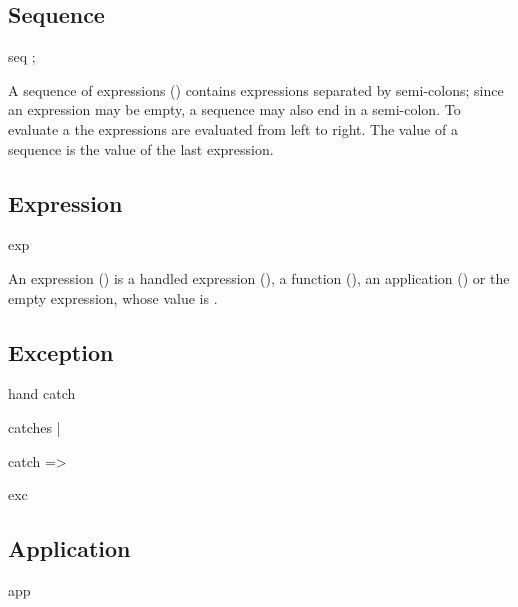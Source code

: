 \documentclass[english]{article}
\newcommand{\cont}{\noindent}
\begin{document}
\subsection{Sequence}

\begin{bnfc}
\item[seq] ; \pclosure
\end{bnfc}

\cont A sequence of expressions () contains expressions
separated by semi-colons; since an expression may be empty, a sequence
may also end in a semi-colon. To evaluate a  the expressions
are evaluated from left to right. The value of a sequence is the value
of the last expression.


\subsection{Expression}

\begin{bnfc}
\item[exp]\Alt{}\Alt{}
\end{bnfc}

\cont An expression () is a handled expression
(), a function (), an application ()
or the empty expression, whose value is .


\subsection{Exception}

\begin{bnfc}
\item[hand] catch 
\item[catches]\Alt{} | 
\item[catch] => 
\item[exc]
\end{bnfc}

\cont


\subsection{Application}

\begin{bnfc}
\item[app]\pclosure
\end{bnfc}
\end{document}
